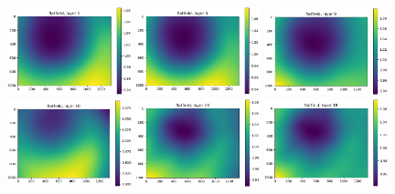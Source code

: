 \documentclass[letterpaper,11pt]{article}
\begin{document}
\begin{figure}[!ht]
\centering
\includegraphics[width=0.32\textwidth]{images/results/flatfield_layers/flatfield_layer_1}
\includegraphics[width=0.32\textwidth]{images/results/flatfield_layers/flatfield_layer_5}
\includegraphics[width=0.32\textwidth]{images/results/flatfield_layers/flatfield_layer_9}
\includegraphics[width=0.32\textwidth]{images/results/flatfield_layers/flatfield_layer_10}
\includegraphics[width=0.32\textwidth]{images/results/flatfield_layers/flatfield_layer_14}
\includegraphics[width=0.32\textwidth]{images/results/flatfield_layers/flatfield_layer_18}

\end{figure}
\end{document}
